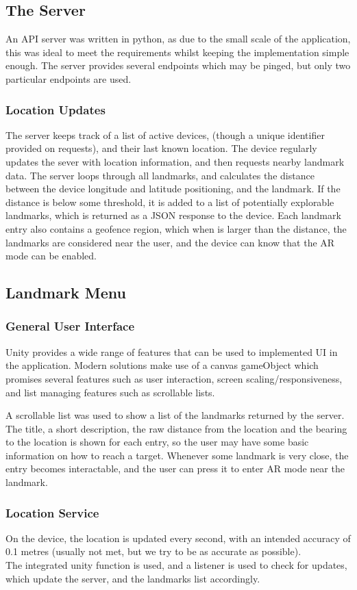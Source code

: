 
\subsection{The Server}
An API server was written in python, as due to the small scale of the application, this was ideal to meet the requirements whilst keeping the 
implementation simple enough. The server provides several endpoints which may be pinged, but only two particular endpoints are used. 
\subsubsection{Location Updates}
The server keeps track of a list of active devices, (though a unique identifier provided on requests), and their last known location.
The device regularly updates the sever with location information, and then requests nearby landmark data. 
The server loops through all landmarks, and calculates the distance between the device longitude and latitude positioning, and the landmark.
If the distance is below some threshold, it is added to a list of potentially explorable landmarks, which is returned as a JSON response 
to the device. Each landmark entry also contains a geofence region, which when is larger than the distance, the landmarks are considered near 
the user, and the device can know that the AR mode can be enabled.


\subsection{Landmark Menu}
\subsubsection{General User Interface}
Unity provides a wide range of features that can be used to implemented UI in the application. 
Modern solutions make use of a canvas gameObject which promises several features such as user interaction, screen scaling/responsiveness, and 
list managing features such as scrollable lists.

A scrollable list was used to show a list of the landmarks returned by the server. The title,
a short description, the raw distance from the location and the bearing to the location is shown for each entry,
 so the user may have some basic information on how to reach a target.
  Whenever some landmark is very close, the entry becomes interactable, and the user can press it 
to enter AR mode near the landmark. 

\subsubsection{Location Service}
On the device, the location is updated every second, with an intended accuracy of 0.1 metres 
(usually not met, but we try to be as accurate as possible).\\
The integrated unity function is used, and a listener is used to check for updates, which update the server,
and the landmarks list accordingly.

